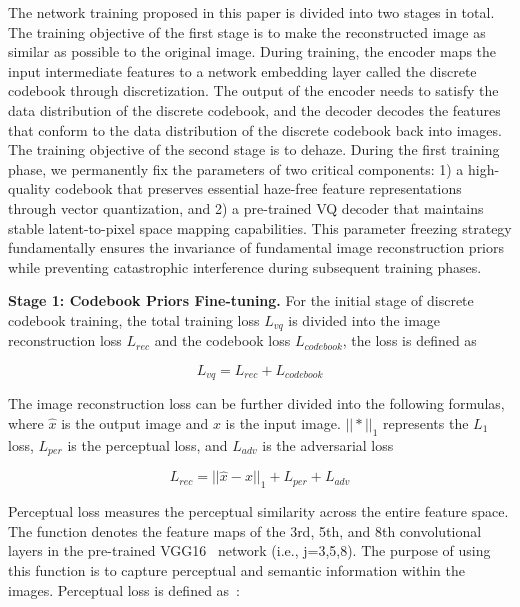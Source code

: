 \documentclass[journal]{IEEEtran}
\begin{document}
The network training proposed in this paper is divided into two stages in total. The training objective of the first stage is to make the reconstructed image as similar as possible to the original image. During training, the encoder maps the input intermediate features to a network embedding layer called the discrete codebook through discretization. The output of the encoder needs to satisfy the data distribution of the discrete codebook, and the decoder decodes the features that conform to the data distribution of the discrete codebook back into images. The training objective of the second stage is to dehaze. During the first training phase, we permanently fix the parameters of two critical components: 1) a high-quality codebook that preserves essential haze-free feature representations through vector quantization, and 2) a pre-trained VQ decoder that maintains stable latent-to-pixel space mapping capabilities. This parameter freezing strategy fundamentally ensures the invariance of fundamental image reconstruction priors while preventing catastrophic interference during subsequent training phases.

	{\bf{Stage 1: Codebook Priors Fine-tuning.}} For the initial stage of discrete codebook training, the total training loss $L_{vq}$ is divided into the image reconstruction loss $L_{rec}$ and the codebook loss $L_{codebook}$, the loss is defined as

\begin{equation}
	\label{vq_loss}
	L_{vq} = L_{rec} + L_{codebook}
\end{equation}

The image reconstruction loss can be further divided into the following formulas, where $\hat{x}$ is the output image and $x$ is the input image. $|| * ||_{1}$ represents the $L_{1}$ loss, $L_{per}$ is the perceptual loss, and $L_{adv}$ is the adversarial loss

\begin{equation}
	\label{reconstruction_loss}
	L_{rec} = || \hat{x} - x ||_{1} + L_{per} + L_{adv}
\end{equation}

Perceptual loss measures the perceptual similarity across the entire feature space. The function denotes the feature maps of the 3rd, 5th, and 8th convolutional layers in the pre-trained VGG16~\cite{simonyan2014very} network (i.e., j=3,5,8). The purpose of using this function is to capture perceptual and semantic information within the images. Perceptual loss is defined as~\cite{johnson2016perceptual}:
\end{document}
